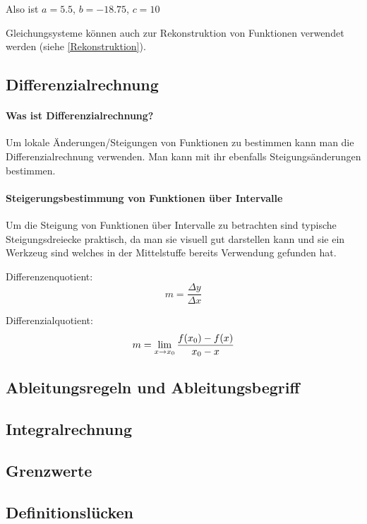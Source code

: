 \documentclass{article}
\begin{document}
Also ist $a=5.5$, $b=-18.75$, $c=10$

Gleichungsysteme können auch zur Rekonstruktion von Funktionen verwendet werden (siehe \ref{Rekonstruktion}). 

\subsection{Differenzialrechnung}
\paragraph{Was ist Differenzialrechnung?}

Um lokale Änderungen/Steigungen von Funktionen zu bestimmen kann man die Differenzialrechnung verwenden.
Man kann mit ihr ebenfalls Steigungsänderungen bestimmen.
\paragraph{Steigerungsbestimmung von Funktionen über Intervalle}

Um die Steigung von Funktionen über Intervalle zu betrachten sind typische Steigungsdreiecke praktisch,
da man sie visuell gut darstellen kann und sie ein Werkzeug sind welches in der Mittelstuffe bereits
Verwendung gefunden hat.

Differenzenquotient:
\[
    m = {\frac {\Delta y} {\Delta x}}
\]

Differenzialquotient:
\[
    m = \lim_{x \to x_{0}} {{f(x_{0}) - f(x)} \over { x_{0} - x}}
\]



\paragraph{}

\subsection{Ableitungsregeln und Ableitungsbegriff}
\subsection{Integralrechnung}

\subsection{Grenzwerte}
\subsection{Definitionslücken}
\end{document}
